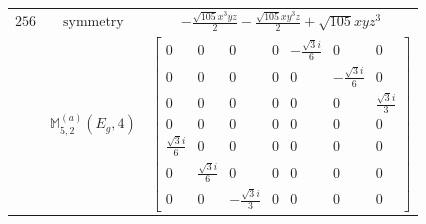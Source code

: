 \documentclass[fleqn,8pt,landscape]{jsarticle}
\begin{document}
\begin{longtable}{ccc}
$ 256 $ & $ \text{symmetry} $ & $ - \frac{\sqrt{105} x^{3} y z}{2} - \frac{\sqrt{105} x y^{3} z}{2} + \sqrt{105} x y z^{3} $ \\
$  $ & $ \mathbb{M}_{5,2}^{(a)}(E_{g},4) $ & $ \begin{bmatrix} 0 & 0 & 0 & 0 & - \frac{\sqrt{3} i}{6} & 0 & 0 \\ 0 & 0 & 0 & 0 & 0 & - \frac{\sqrt{3} i}{6} & 0 \\ 0 & 0 & 0 & 0 & 0 & 0 & \frac{\sqrt{3} i}{3} \\ 0 & 0 & 0 & 0 & 0 & 0 & 0 \\ \frac{\sqrt{3} i}{6} & 0 & 0 & 0 & 0 & 0 & 0 \\ 0 & \frac{\sqrt{3} i}{6} & 0 & 0 & 0 & 0 & 0 \\ 0 & 0 & - \frac{\sqrt{3} i}{3} & 0 & 0 & 0 & 0 \end{bmatrix} $ \\ \hline
\end{longtable}
\end{document}
